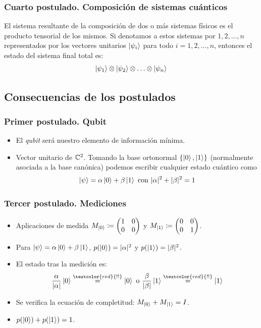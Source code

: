\documentclass{beamer}
\begin{document}
\begin{frame}
	\frametitle{Cuarto postulado. Composición de sistemas cuánticos}
	
	\begin{postulate} El sistema resultante de la composición de dos o más sistemas físicos es el producto tensorial de los mismos. Si denotamos a estos sistemas por $1,2,...,n$ representados por los vectores unitarios $\left|\psi_i\right\rangle$ para todo $i=1,2,...,n$, entonces el estado del sistema final total es:
	$$\left|\psi_1\right\rangle\otimes\left|\psi_2\right\rangle\otimes\hdots\otimes\left|\psi_n\right\rangle$$
\end{postulate}
\end{frame}

\subsection*{Consecuencias de los postulados}
\begin{frame}
	\frametitle{Primer postulado. Qubit}
	
	\begin{itemize}
	\item El \emph{qubit} será nuestro elemento de información mínima.
	\item Vector unitario de $\mathbb{C}^2$. Tomando la base ortonormal $\{\left|0\right\rangle,\left|1\right\rangle\}$ (normalmente asociada a la base canónica) podemos escribir cualquier estado cuántico como
	$$\left|\psi\right\rangle=\alpha\left|0\right\rangle+\beta\left|1\right\rangle\textrm{ con }|\alpha|^2+|\beta|^2=1$$
	\end{itemize}
\end{frame}

\begin{frame}
	\frametitle{Tercer postulado. Mediciones}
	
	\begin{itemize}
	\item Aplicaciones de medida $M_{\left|0\right\rangle}\coloneqq\left(\begin{matrix}1&0\\0&0\end{matrix}\right)$ y $M_{\left|1\right\rangle}\coloneqq\left(\begin{matrix}0&0\\0&1\end{matrix}\right)$.
	\item Para $\left|\psi\right\rangle=\alpha\left|0\right\rangle+\beta\left|1\right\rangle$, $p(\left|0\right\rangle)=|\alpha|^2$ y $p(\left|1\right\rangle)=|\beta|^2$.
	\item El estado tras la medición es:
		$$\dfrac{\alpha}{|\alpha|}\ket0\overset{\textcolor{red}{!!}}=\ket0\textrm{ o }\dfrac{\beta}{|\beta|}\ket1\overset{\textcolor{red}{!!}}=\ket1$$
	\item Se verifica la ecuación de completitud: $M_{\left|0\right\rangle} + M_{\left|1\right\rangle}=I$.
	\item $p(\left|0\right\rangle)+p(\left|1\right\rangle)=1$.
	
	\end{itemize}
\end{frame}
\end{document}
